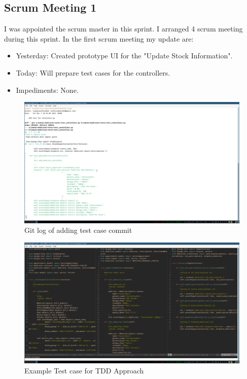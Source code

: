 \documentclass[a4paper,12pt]{article}
\begin{document}
\subsection{Scrum Meeting 1}
I was appointed the scrum master in this sprint. I arranged 4 scrum meeting during this sprint. In the first
scrum meeting my update are:
\begin{itemize}
    \item Yesterday: Created prototype UI for the "Update Stock Information".
    \item Today: Will prepare test cases for the controllers.
    \item Impediments: None.
\end{itemize}
\begin{figure}[H]
    \centering
    \includegraphics[width=1\textwidth]{images/meet11.png}   
    \caption{Git log of adding test case commit}
    \label{fig:meet11}
\end{figure}
\begin{figure}[H]
    \centering
    \includegraphics[width=1\textwidth]{images/meet12.png}   
    \caption{Example Test case for TDD Approach}
    \label{fig:meet12}
\end{figure}
\end{document}
